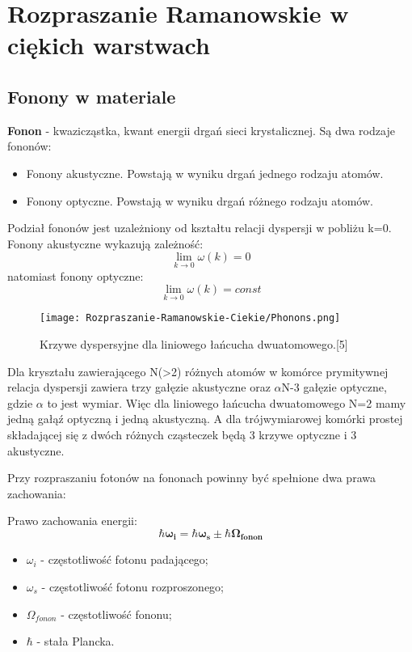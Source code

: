 \newpage

\section{Rozpraszanie Ramanowskie w ciękich warstwach}
\subsection{Fonony w materiale}
\textbf{Fonon} -  kwazicząstka, kwant energii drgań sieci krystalicznej. Są dwa rodzaje fononów:
\begin{itemize}
	\item{Fonony akustyczne. Powstają w wyniku drgań jednego rodzaju atomów.}
	\item{Fonony optyczne. Powstają w wyniku drgań różnego rodzaju atomów.}
\end{itemize}
Podział fononów jest uzależniony od kształtu relacji dyspersji w pobliżu k=0. \\
Fonony akustyczne wykazują zależność:
\begin{equation}
	\lim_{k \to 0} \omega(k) = 0
\end{equation}
natomiast fonony optyczne:
\begin{equation}
\lim_{k \to 0} \omega(k) = const
\end{equation}
\begin{figure}[H]
	\begin{center}
		\texttt{[image: Rozpraszanie-Ramanowskie-Ciekie/Phonons.png]}
		\caption{Krzywe dyspersyjne dla liniowego łańcucha dwuatomowego.[5]}
	\end{center}
\end{figure}
Dla kryształu zawierającego N(>2) różnych atomów w komórce prymitywnej relacja dyspersji zawiera trzy gałęzie akustyczne oraz $\alpha$N-3 gałęzie optyczne, gdzie $\alpha$ to jest wymiar. Więc dla liniowego łańcucha dwuatomowego N=2 mamy jedną gałąź optyczną i jedną akustyczną. A dla trójwymiarowej komórki prostej składającej się z dwóch różnych cząsteczek będą 3 krzywe optyczne i 3 akustyczne.

Przy rozpraszaniu fotonów na fononach powinny być spełnione dwa prawa zachowania: 

Prawo zachowania energii:
\begin{equation}
	\hbar \mathbf{\omega_{i}} = \hbar \mathbf{\omega_{s}} \pm \hbar \mathbf{\Omega_{fonon}}
\end{equation}
\begin{itemize}
	\item $\omega_{i}$ - częstotliwość fotonu padającego;
	\item $\omega_{s}$ - częstotliwość fotonu rozproszonego;
	\item $\Omega_{fonon}$ - częstotliwość fononu;
	\item $\hbar$ - stała Plancka.
\end{itemize}

